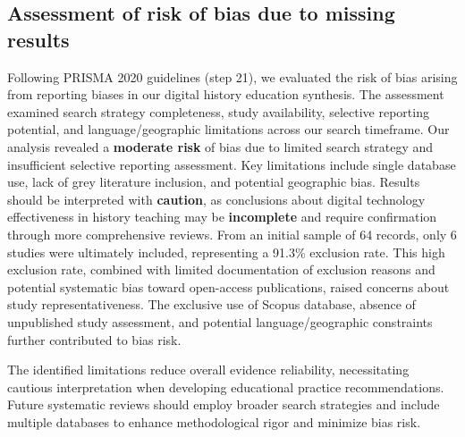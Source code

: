 \documentclass[
hf,
]{ceurart}
\begin{document}




\subsection{Assessment of risk of bias due to missing results}

Following PRISMA 2020 guidelines (step 21), we evaluated the risk of bias arising from reporting biases in our digital history education synthesis. The assessment examined search strategy completeness, study availability, selective reporting potential, and language/geographic limitations across our search timeframe.
Our analysis revealed a {\textbf{moderate risk}} of bias due to limited search strategy and insufficient selective reporting assessment. Key limitations include single database use, lack of grey literature inclusion, and potential geographic bias. Results should be interpreted with \textbf{caution}, as conclusions about digital technology effectiveness in history teaching may be \textbf{incomplete} and require confirmation through more comprehensive reviews. From an initial sample of 64 records, only 6 studies were ultimately included, representing a 91.3\% exclusion rate. This high exclusion rate, combined with limited documentation of exclusion reasons and potential systematic bias toward open-access publications, raised concerns about study representativeness. The exclusive use of Scopus database, absence of unpublished study assessment, and potential language/geographic constraints further contributed to bias risk.

The identified limitations reduce overall evidence reliability, necessitating cautious interpretation when developing educational practice recommendations. Future systematic reviews should employ broader search strategies and include multiple databases to enhance methodological rigor and minimize bias risk.

\end{document}
